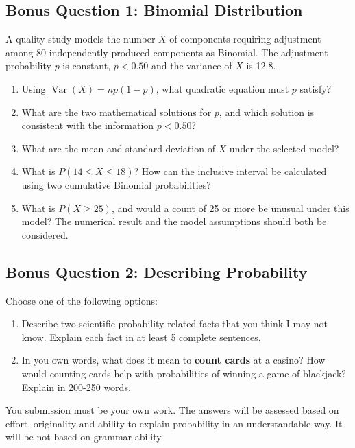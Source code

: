 \documentclass[10pt,letterpaper]{article}
\providecommand{\tightlist}{%
  \setlength{\itemsep}{0pt}\setlength{\parskip}{0pt}}
\begin{document}
\newpage

\subsection*{Bonus Question 1: Binomial Distribution}
A quality study models the number \(X\) of components requiring adjustment among 80 independently produced components as Binomial. The adjustment probability \(p\) is constant, \(p<0.50\) and the variance of \(X\) is 12.8.

\begin{enumerate}
\def\labelenumi{\arabic{enumi}.}
\tightlist
	\item Using \(\operatorname{Var}(X)=np(1-p)\), what quadratic equation must \(p\) satisfy?
	\item What are the two mathematical solutions for \(p\), and which solution is consistent with the information \(p<0.50\)?
	\item What are the mean and standard deviation of \(X\) under the selected model?
	\item What is \(P(14\le X\le18)\)? How can the inclusive interval be calculated using two cumulative Binomial probabilities?
	\item What is \(P(X\ge25)\), and would a count of 25 or more be unusual under this model? The numerical result and the model assumptions should both be considered.
\end{enumerate}

\subsection*{Bonus Question 2: Describing Probability}
Choose one of the following options:

\begin{enumerate}
\def\labelenumi{\arabic{enumi}.}
\tightlist
\item Describe two scientific probability related facts that you think I may not know. Explain each fact in at least 5 complete sentences. 
\item In you own words, what does it mean to \textbf{count cards} at a casino? How would counting cards help with probabilities of winning a game of blackjack? Explain in 200-250 words. 
\end{enumerate}

You submission must be your own work. The answers will be assessed based on effort, originality and ability to explain probability in an understandable way. It will be not based on grammar ability. 
\end{document}

